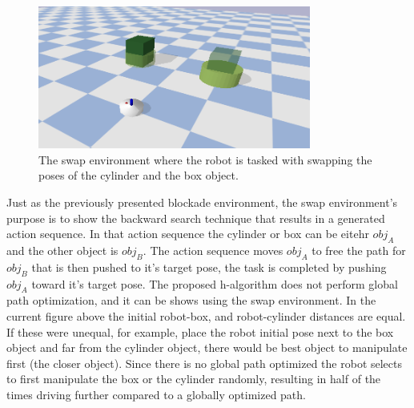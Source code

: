 \begin{figure}[H]
  \centering
  \includegraphics[width=0.8\textwidth]{figures/results/swap}
  \caption{The swap environment where the robot is tasked with swapping the poses of the cylinder and the box object.}%
  \label{fig:benchmark_swap}
\end{figure}
Just as the previously presented blockade environment, the swap environment's purpose is to show the backward search technique that results in a generated action sequence. In that action sequence the cylinder or box can be eitehr $\mathit{obj_A}$ and the other object is $\mathit{obj_B}$. The action sequence moves $\mathit{obj_A}$ to free the path for $\mathit{obj_B}$ that is then pushed to it's target pose, the task is completed by pushing $\mathit{obj_A}$ toward it's target pose. The proposed \ac{h-algorithm} does not perform global path optimization, and it can be shows using the swap environment. In the current figure above the initial robot-box, and robot-cylinder distances are equal. If these were unequal, for example, place the robot initial pose next to the box object and far from the cylinder object, there would be best object to manipulate first (the closer object). Since there is no global path optimized the robot selects to first manipulate the box or the cylinder randomly, resulting in half of the times driving further compared to a globally optimized path.\bs

